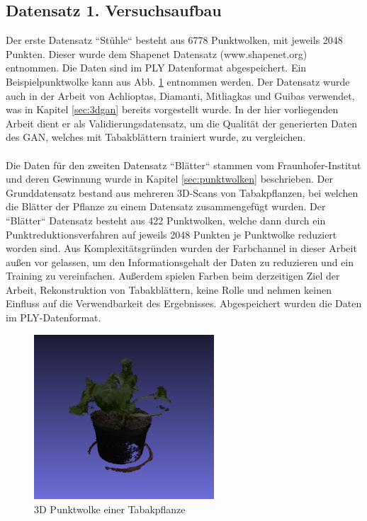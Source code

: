 \documentclass{llncs}
\begin{document}
\subsection{Datensatz 1. Versuchsaufbau}\label{sec:versuch1-traingsdaten}

Der erste Datensatz ``Stühle`` besteht aus 6778 Punktwolken, mit jeweils 2048 Punkten. Dieser wurde dem Shapenet Datensatz (www.shapenet.org) entnommen. Die Daten sind im PLY Datenformat abgespeichert. Ein Beispielpunktwolke kann aus Abb. \ref{fig:Bild50} entnommen werden. Der Datensatz wurde auch in der Arbeit von Achlioptas, Diamanti, Mitliagkas und Guibas \cite{3dgan} verwendet, was in Kapitel \ref{sec:3dgan} bereits vorgestellt wurde. In der hier vorliegenden Arbeit dient er als Validierungsdatensatz, um die Qualität der generierten Daten des GAN, welches mit Tabakblättern trainiert wurde, zu vergleichen.
\\\\
Die Daten für den zweiten Datensatz ``Blätter`` stammen vom Fraunhofer-Institut und deren Gewinnung wurde in Kapitel \ref{sec:punktwolken} beschrieben. Der Grunddatensatz bestand aus mehreren 3D-Scans von Tabakpflanzen, bei welchen die Blätter der Pflanze zu einem Datensatz zusammengefügt wurden. Der ``Blätter`` Datensatz besteht aus 422 Punktwolken, welche dann durch ein Punktreduktionsverfahren auf jeweils 2048 Punkten je Punktwolke reduziert worden sind. Aus Komplexitätsgründen wurden der Farbchannel in dieser Arbeit außen vor gelassen, um den Informationsgehalt der Daten zu reduzieren und ein Training zu vereinfachen. Außerdem spielen Farben beim derzeitigen Ziel der Arbeit, Rekonstruktion von Tabakblättern, keine Rolle und nehmen keinen Einfluss auf die Verwendbarkeit des Ergebnisses. Abgespeichert wurden die Daten im PLY-Datenformat.

\begin{figure}[htbp] 
	\centering
	\includegraphics[width=0.6\textwidth]{plant.png}
	\caption{3D Punktwolke einer Tabakpflanze}
	\label{fig:Bild50}
\end{figure}
\end{document}
